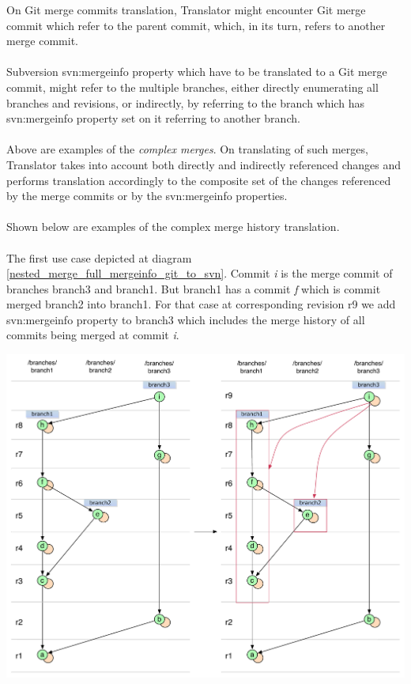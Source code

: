 On Git merge commits translation, Translator might encounter Git merge commit which refer to the parent commit, which,
in its turn, refers to another merge commit.
\\\\
Subversion svn:mergeinfo property which have to be translated to a Git merge commit, might refer to the multiple branches,
either directly enumerating all branches and revisions, or indirectly, by referring to the branch which has svn:mergeinfo property set on it referring to another branch.
\\\\
Above are examples of the \emph{complex merges}. On translating of such merges, Translator takes into account both
directly and indirectly referenced changes and performs translation accordingly to the composite set of the 
changes referenced by the merge commits or by the svn:mergeinfo properties.
\\\\
Shown below are examples of the complex merge history translation.
\\\\
The first use case depicted at diagram \ref{nested_merge_full_mergeinfo_git_to_svn}. 
Commit \emph{i} is the merge commit of branches branch3 and branch1. 
But branch1 has a commit \emph{f} which is commit merged branch2 into branch1. 
For that case at corresponding revision r9 we add svn:mergeinfo property to branch3 which includes the merge history of all commits being merged at commit \emph{i}.

\begin{center}
\includegraphics[width=\textwidth]{img/diagrams/nested_merge_full_mergeinfo_git_to_svn.pdf}%
\label{nested_merge_full_mergeinfo_git_to_svn}%
\end{center}


